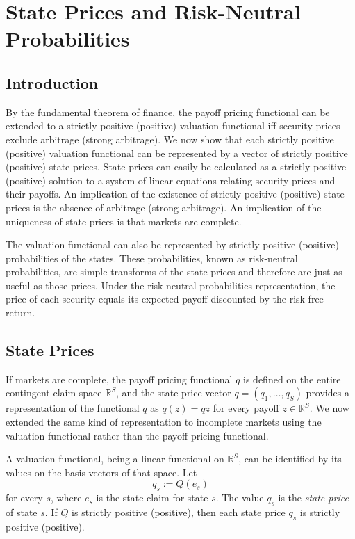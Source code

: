 \documentclass[\topdir/lecture\_notes.tex]{subfiles}
\begin{document}
\section{State Prices and Risk-Neutral Probabilities}
\subsection{Introduction}
By the fundamental theorem of finance, the payoff pricing functional can be extended to a strictly positive (positive) valuation functional iff security prices exclude arbitrage (strong arbitrage). We now show that each strictly positive (positive) valuation functional can be represented by a vector of strictly positive (positive) state prices. State prices can easily be calculated as a strictly positive (positive) solution to a system of linear equations relating security prices and their payoffs. An implication of the existence of strictly positive (positive) state prices is the absence of arbitrage (strong arbitrage). An implication of the uniqueness of state prices is that markets are complete.

The valuation functional can also be represented by strictly positive (positive) probabilities of the states. These probabilities, known as risk-neutral probabilities, are simple transforms of the state prices and therefore are just as useful as those prices. Under the risk-neutral probabilities representation, the price of each security equals its expected payoff discounted by the risk-free return.

\subsection{State Prices}
If markets are complete, the payoff pricing functional $q$ is defined on the entire contingent claim space $\mathbb{R}^{S}$, and the state price vector $q=(q_{1}, \ldots, q_{S})$ provides a representation of the functional $q$ as $q(z)=q z$ for every payoff $z \in \mathbb{R}^{S}$. We now extended the same kind of representation to incomplete markets using the valuation functional rather than the payoff pricing functional.

A valuation functional, being a linear functional on $\mathbb{R}^{S}$, can be identified by its values on the basis vectors of that space. Let
\begin{equation}
q_{s} := Q(e_{s}) \label{eq:state_price_definition} 
\end{equation}
for every $s$, where $e_{s}$ is the state claim for state $s$. The value $q_{s}$ is the \emph{state price} of state $s$. If $Q$ is strictly positive (positive), then each state price $q_{s}$ is strictly positive (positive).
\end{document}
